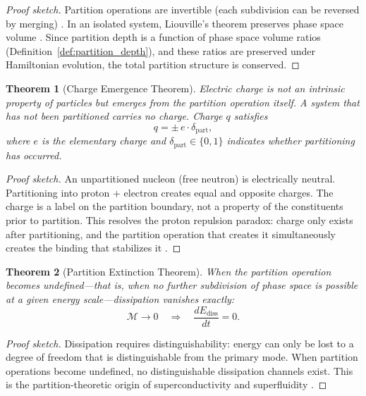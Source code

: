 \documentclass[11pt,twocolumn,a4paper]{article}
\theoremstyle{plain}
\newtheorem{theorem}{Theorem}[section]
\theoremstyle{definition}
\theoremstyle{remark}
\newcommand{\Depth}{\mathcal{M}}
\begin{document}
\begin{proof}[Proof sketch]
Partition operations are invertible (each subdivision can be reversed by merging) \cite{bennett1973logical}. In an isolated system, Liouville's theorem preserves phase space volume \cite{arnold1978mathematical}. Since partition depth is a function of phase space volume ratios (Definition~\ref{def:partition_depth}), and these ratios are preserved under Hamiltonian evolution, the total partition structure is conserved.
\end{proof}

\begin{theorem}[Charge Emergence Theorem]
\label{thm:charge}
Electric charge is not an intrinsic property of particles but emerges from the partition operation itself. A system that has not been partitioned carries no charge. Charge $q$ satisfies
\begin{equation}
q = \pm\, e \cdot \delta_{\mathrm{part}},
\label{eq:charge}
\end{equation}
where $e$ is the elementary charge and $\delta_{\mathrm{part}} \in \{0, 1\}$ indicates whether partitioning has occurred.
\end{theorem}

\begin{proof}[Proof sketch]
An unpartitioned nucleon (free neutron) is electrically neutral. Partitioning into proton + electron creates equal and opposite charges. The charge is a label on the partition boundary, not a property of the constituents prior to partition. This resolves the proton repulsion paradox: charge only exists after partitioning, and the partition operation that creates it simultaneously creates the binding that stabilizes it \cite{sachikonye2026partition}.
\end{proof}

\begin{theorem}[Partition Extinction Theorem]
\label{thm:extinction}
When the partition operation becomes undefined---that is, when no further subdivision of phase space is possible at a given energy scale---dissipation vanishes exactly:
\begin{equation}
\Depth \to 0 \quad \Longrightarrow \quad \frac{dE_{\mathrm{diss}}}{dt} = 0.
\label{eq:extinction}
\end{equation}
\end{theorem}

\begin{proof}[Proof sketch]
Dissipation requires distinguishability: energy can only be lost to a degree of freedom that is distinguishable from the primary mode. When partition operations become undefined, no distinguishable dissipation channels exist. This is the partition-theoretic origin of superconductivity and superfluidity \cite{sachikonye2026partition}.
\end{proof}
\end{document}
